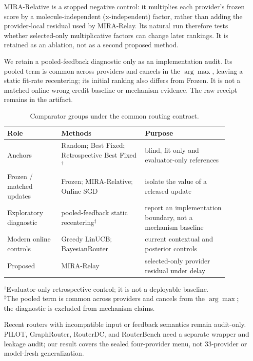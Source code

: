 \documentclass[sigconf,anonymous]{aamas}
\begin{document}
MIRA-Relative is a stopped negative control: it multiplies each provider's frozen score by a molecule-independent (x-independent) factor, rather than adding the provider-local residual used by MIRA-Relay. Its natural run therefore tests whether selected-only multiplicative factors can change later rankings. It is retained as an ablation, not as a second proposed method.

We retain a pooled-feedback diagnostic only as an implementation audit. Its
pooled term is common across providers and cancels in the $\arg\max$, leaving
a static fit-rate recentering; its initial ranking also differs from Frozen. It
is not a matched online wrong-credit baseline or mechanism evidence. The raw
receipt remains in the artifact.

\begin{table}[t]
\caption{Comparator groups under the common routing contract.}
\label{tab:baselines}
\footnotesize
\begin{tabular}{@{}P{0.22\linewidth}P{0.34\linewidth}P{0.34\linewidth}@{}}
\toprule
Role & Methods & Purpose \\
\midrule
Anchors & Random; Best Fixed; Retrospective Best Fixed$^{\dagger}$ & blind, fit-only and evaluator-only references \\
Frozen / matched updates & Frozen; MIRA-Relative; Online SGD & isolate the value of a released update \\
Exploratory diagnostic & pooled-feedback static recentering$^{\ddagger}$ & report an implementation boundary, not a mechanism baseline \\
Modern online controls & Greedy LinUCB; BayesianRouter & current contextual and posterior controls \\
Proposed & MIRA-Relay & selected-only provider residual under delay \\
\bottomrule
\end{tabular}
\begin{flushleft}
\footnotesize $^{\dagger}$Evaluator-only retrospective control; it is not a deployable baseline.
\\[-2pt]
\footnotesize $^{\ddagger}$The pooled term is common across providers and cancels from the $\arg\max$; the diagnostic is excluded from mechanism claims.
\end{flushleft}
\end{table}

Recent routers with incompatible input or feedback semantics remain audit-only. PILOT, GraphRouter, RouterDC, and RouterBench need a separate wrapper and leakage audit; our result covers the sealed four-provider menu, not 33-provider or model-fresh generalization.
\end{document}
